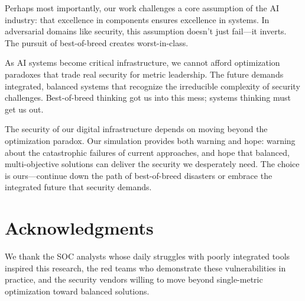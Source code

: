 \documentclass[10pt,conference]{IEEEtran}
\begin{document}
Perhaps most importantly, our work challenges a core assumption of the AI industry: that excellence in components ensures excellence in systems. In adversarial domains like security, this assumption doesn't just fail---it inverts. The pursuit of best-of-breed creates worst-in-class.

As AI systems become critical infrastructure, we cannot afford optimization paradoxes that trade real security for metric leadership. The future demands integrated, balanced systems that recognize the irreducible complexity of security challenges. Best-of-breed thinking got us into this mess; systems thinking must get us out.

The security of our digital infrastructure depends on moving beyond the optimization paradox. Our simulation provides both warning and hope: warning about the catastrophic failures of current approaches, and hope that balanced, multi-objective solutions can deliver the security we desperately need. The choice is ours---continue down the path of best-of-breed disasters or embrace the integrated future that security demands.

\section*{Acknowledgments}
We thank the SOC analysts whose daily struggles with poorly integrated tools inspired this research, the red teams who demonstrate these vulnerabilities in practice, and the security vendors willing to move beyond single-metric optimization toward balanced solutions.
\end{document}
